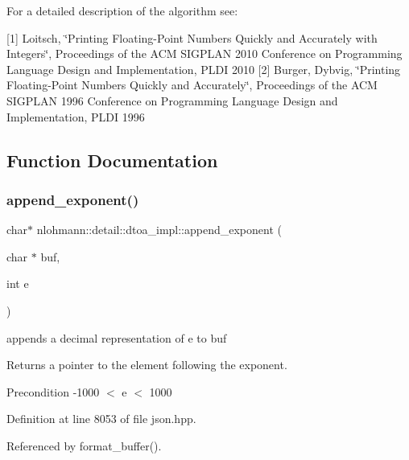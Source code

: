 For a detailed description of the algorithm see\+:

\mbox{[}1\mbox{]} Loitsch, \char`\"{}\+Printing Floating-\/\+Point Numbers Quickly and Accurately with
    Integers\char`\"{}, Proceedings of the A\+CM S\+I\+G\+P\+L\+AN 2010 Conference on Programming Language Design and Implementation, P\+L\+DI 2010 \mbox{[}2\mbox{]} Burger, Dybvig, \char`\"{}\+Printing Floating-\/\+Point Numbers Quickly and Accurately\char`\"{}, Proceedings of the A\+CM S\+I\+G\+P\+L\+AN 1996 Conference on Programming Language Design and Implementation, P\+L\+DI 1996 

\subsection{Function Documentation}
\mbox{\label{namespacenlohmann_1_1detail_1_1dtoa__impl_a84733638b826eda624488f5fa4521e0b}} 
\subsubsection{\texorpdfstring{append\+\_\+exponent()}{append\_exponent()}}
{\footnotesize\ttfamily char$\ast$ nlohmann\+::detail\+::dtoa\+\_\+impl\+::append\+\_\+exponent (\begin{DoxyParamCaption}\item[{char $\ast$}]{buf,  }\item[{int}]{e }\end{DoxyParamCaption})\hspace{0.3cm}{\ttfamily [inline]}}



appends a decimal representation of e to buf 

\begin{DoxyReturn}{Returns}
a pointer to the element following the exponent. 
\end{DoxyReturn}
\begin{DoxyPrecond}{Precondition}
-\/1000 $<$ e $<$ 1000 
\end{DoxyPrecond}


Definition at line 8053 of file json.\+hpp.



Referenced by format\+\_\+buffer().


